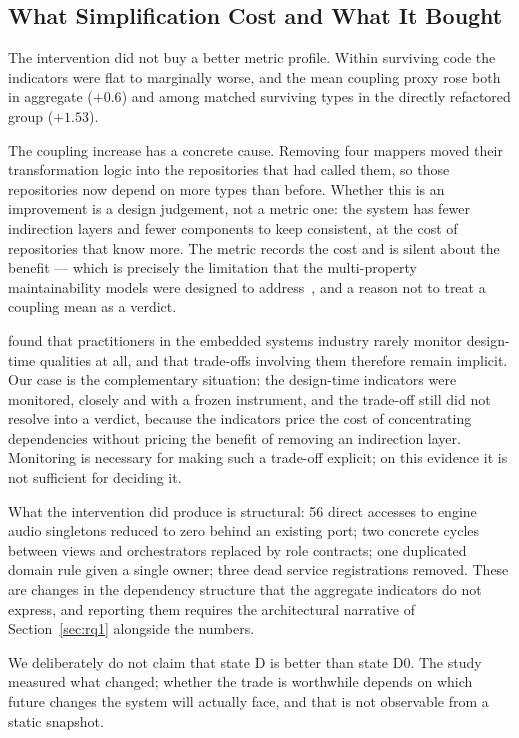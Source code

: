 \documentclass[pdflatex,sn-basic]{sn-jnl}
\begin{document}
\subsection{What Simplification Cost and What It Bought}

The intervention did not buy a better metric profile. Within surviving code the indicators were flat to marginally worse, and the mean coupling proxy rose both in aggregate ($+0.6$) and among matched surviving types in the directly refactored group ($+1.53$).

The coupling increase has a concrete cause. Removing four mappers moved their transformation logic into the repositories that had called them, so those repositories now depend on more types than before. Whether this is an improvement is a design judgement, not a metric one: the system has fewer indirection layers and fewer components to keep consistent, at the cost of repositories that know more. The metric records the cost and is silent about the benefit --- which is precisely the limitation that the multi-property maintainability models were designed to address~\citep{heitlager2007,baggen2012}, and a reason not to treat a coupling mean as a verdict.

\citet{sas2020} found that practitioners in the embedded systems industry rarely monitor design-time qualities at all, and that trade-offs involving them therefore remain implicit. Our case is the complementary situation: the design-time indicators were monitored, closely and with a frozen instrument, and the trade-off still did not resolve into a verdict, because the indicators price the cost of concentrating dependencies without pricing the benefit of removing an indirection layer. Monitoring is necessary for making such a trade-off explicit; on this evidence it is not sufficient for deciding it.

What the intervention did produce is structural: 56 direct accesses to engine audio singletons reduced to zero behind an existing port; two concrete cycles between views and orchestrators replaced by role contracts; one duplicated domain rule given a single owner; three dead service registrations removed. These are changes in the dependency structure that the aggregate indicators do not express, and reporting them requires the architectural narrative of Section~\ref{sec:rq1} alongside the numbers.

We deliberately do not claim that state D is better than state D0. The study measured what changed; whether the trade is worthwhile depends on which future changes the system will actually face, and that is not observable from a static snapshot.
\end{document}
